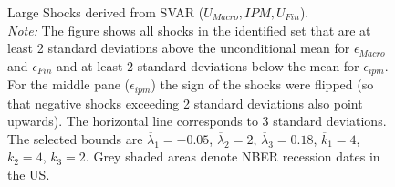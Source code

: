 \documentclass[a4paper,11pt,listof=nochaptergap,oneside,pointednumbers,bibtotoc,bigheadings,liststotoc,hidelinks]{scrbook}
\theoremstyle{mysatz}
\theoremstyle{mydefinition}
\theoremstyle{mytheorem}
\theoremstyle{mybemerkung}
\begin{document}
\begin{figure}[!h]
   \centering
   \setlength\fboxsep{0pt}
   \setlength\fboxrule{0pt}
      \caption[Large Shocks derived from SVAR ($U_{Macro}, IPM, U_{Fin}$).]{Large Shocks derived from SVAR ($U_{Macro}, IPM, U_{Fin}$).\\
      \textit{Note:}  The figure shows all shocks in the identified set that are at least 2 standard deviations above the unconditional mean for $\epsilon_{Macro}$ and $\epsilon_{Fin}$ and at least 2 standard deviations below the mean for $\epsilon_{ipm}$. For the middle pane ($\epsilon_{ipm}$) the sign of the shocks were flipped (so that negative shocks exceeding 2 standard deviations also point upwards). The horizontal line corresponds to 3 standard deviations. The selected bounds are $\overline{\lambda}_1 = -0.05$, $\overline{\lambda}_2 = 2$, $\overline{\lambda}_3 = 0.18$, $\overline{k}_1 = 4$, $\overline{k}_2 = 4$, $\overline{k}_3 = 2$. Grey shaded areas denote NBER recession dates in the US.}   \label{fig:ludvigsonetal_timeseries_e_largeshocks}
\end{figure}
\end{document}
